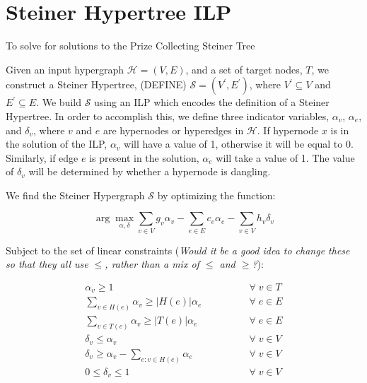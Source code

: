 \documentclass[12pt,twoside]{reedthesis}
\theoremstyle{definition}
\newcommand{\argmax}{\arg\!\max}
\begin{document}
\section{Steiner Hypertree ILP}

To solve for solutions to the Prize Collecting Steiner Tree

Given an input hypergraph $\mathcal{H}=(V,E)$, and a set of target nodes, $T$, we construct a Steiner Hypertree, (DEFINE) $\mathcal{S}= (V^\prime,E^\prime)$, where $V^\prime \subseteq V$ and $E^\prime \subseteq E$.  We build $\mathcal{S}$ using an ILP which encodes the definition of a Steiner Hypertree.  In order to accomplish this, we define three indicator variables, $\alpha_v$, $\alpha_e$, and $\delta_v$, where $v$ and $e$ are hypernodes or hyperedges in $\mathcal{H}$.  If hypernode $x$ is in the solution of the ILP, $\alpha_v$ will have a value of 1, otherwise it will be equal to 0.  Similarly, if edge $e$ is present in the solution, $\alpha_e$ will take a value of 1. The value of $\delta_v$ will be determined by whether a hypernode is dangling.\par

We find the Steiner Hypergraph $\mathcal{S}$ by optimizing the function:

\begin{equation} \label{eq:ilpsum}
 \argmax_{\alpha, \delta} \sum_{v \in V} g_v \alpha_v - \sum_{e \in E} c_e \alpha_e - \sum_{v \in V} h_v \delta_v
\end{equation}

Subject to the set of linear constraints (\emph{Would it be a good idea to change these so that they all use $\leq$, rather than a mix of $\leq$ and $\geq$?}):

\begin{align}
 \alpha_v \geq 1 \qquad\qquad &\forall\; v \in T\label{eq:ilpT}\\
 \sum_{v \in H(e)} \alpha_v \geq \lvert H(e)\rvert \alpha_e \qquad\qquad &\forall\; e \in E\label{eq:ilpinchead}\\
 \sum_{v \in T(e)} \alpha_v \geq \lvert T(e)\rvert \alpha_e\qquad\qquad &\forall\; e \in E\label{eq:ilpinctail}\\
 \delta_v \leq \alpha_v \qquad\qquad &\forall\; v \in V\label{eq:ilpdang1}\\
 \delta_v \geq \alpha_{v} - \sum_{e:v \in H(e)} \alpha_e \qquad\qquad &\forall\; v \in V\label{eq:ilpdang2}\\
0 \leq \delta_v \leq 1 \qquad\qquad &\forall\; v \in V\label{eq:ilpdang3}%
\end{align}%
\end{document}
